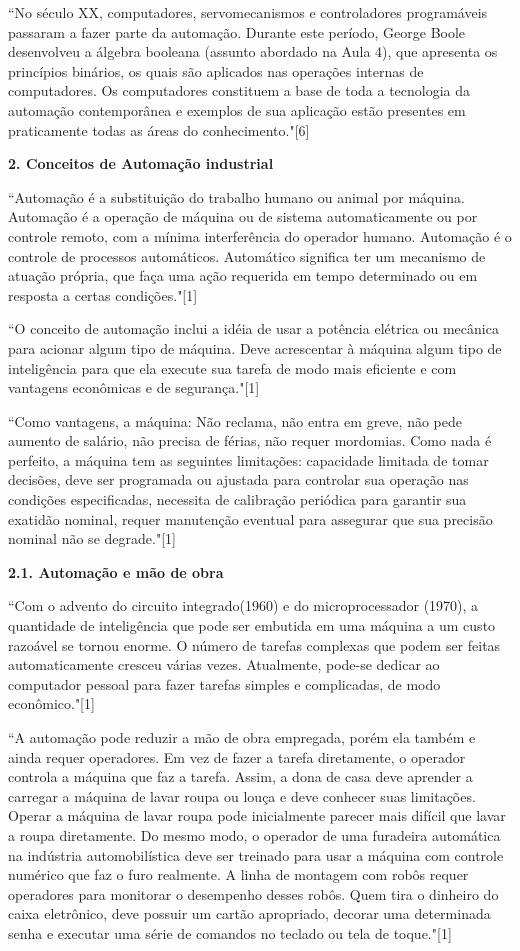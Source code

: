 \documentclass[a4paper, 12pt]{article}
\begin{document}
``No século XX, computadores, servomecanismos e controladores programáveis
passaram a fazer parte da automação. Durante este período,
George Boole desenvolveu a álgebra booleana (assunto abordado na Aula 4),
que apresenta os princípios binários, os quais são aplicados nas operações
internas de computadores. Os computadores constituem a base de toda a
tecnologia da automação contemporânea e exemplos de sua aplicação estão
presentes em praticamente todas as áreas do conhecimento."[6]

\textbf{2. Conceitos de Automação industrial}

``Automação é a substituição do trabalho humano ou animal por máquina.
Automação é a operação de máquina ou de sistema automaticamente ou por
controle remoto, com a mínima interferência do operador humano.
Automação é o controle de processos automáticos. Automático significa ter
um mecanismo de atuação própria, que faça uma ação requerida em tempo 
determinado ou em resposta a certas condições."[1]

``O conceito de automação inclui a idéia de usar a potência elétrica ou 
mecânica para acionar algum tipo de máquina. Deve acrescentar à máquina
algum tipo de inteligência para que ela execute sua tarefa de modo mais
eficiente e com vantagens econômicas e de segurança."[1]

``Como vantagens, a máquina: Não reclama, não entra em greve, não pede 
aumento de salário, não precisa de férias, não requer mordomias.
Como nada é perfeito, a máquina tem as seguintes limitações: capacidade 
limitada de tomar decisões, deve ser programada ou ajustada para controlar
sua operação nas condições especificadas, necessita de calibração periódica
para garantir sua exatidão nominal, requer manutenção eventual para assegurar
que sua precisão nominal não se degrade."[1]

\textbf{2.1. Automação e mão de obra}

``Com o advento do circuito integrado(1960) e do microprocessador (1970), a
quantidade de inteligência que pode ser embutida em uma máquina a um custo
razoável se tornou enorme. O número de tarefas complexas que podem ser feitas
automaticamente cresceu várias vezes. Atualmente, pode-se dedicar ao computador
pessoal para fazer tarefas simples e complicadas, de modo econômico."[1]

``A automação pode reduzir a mão de obra empregada, porém ela também e
ainda requer operadores. Em vez de fazer a tarefa diretamente, o operador
controla a máquina que faz a tarefa. Assim, a dona de casa deve aprender a
carregar a máquina de lavar roupa ou louça e deve conhecer suas limitações.
Operar a máquina de lavar roupa pode inicialmente parecer mais difícil que
lavar a roupa diretamente. Do mesmo modo, o operador de uma furadeira 
automática na indústria automobilística deve ser treinado para usar
a máquina com controle numérico que faz o furo realmente. A linha de 
montagem com robôs requer operadores para monitorar o desempenho desses robôs.
Quem tira o dinheiro do caixa eletrônico, deve possuir um cartão apropriado,
decorar uma determinada senha e executar uma série de comandos no teclado 
ou tela de toque."[1]
\end{document}
